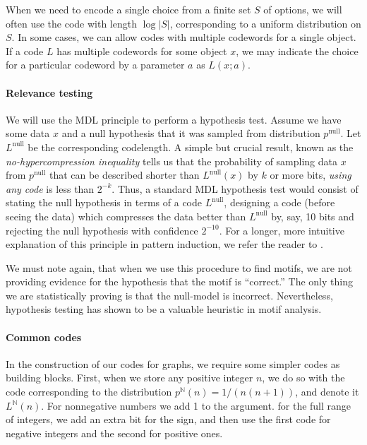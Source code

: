 \documentclass[letterpaper]{article} %
\newcommand{\N}{{\mathbb N}}
\begin{document}
When we need to encode a single choice from a finite set $S$ of options, we will often use the code with length $\log |S|$, corresponding to a uniform distribution on $S$. In some cases, we can allow codes with multiple codewords for a single object. If a code $L$ has multiple codewords for some object  $x$, we may indicate the choice for a particular codeword by a parameter $a$ as $L(x; a)$.

\paragraph{Relevance testing} We will use the MDL principle to perform a hypothesis test. Assume we have some data $x$ and a null hypothesis that it was sampled from distribution $p^\text{null}$. Let $L^\text{null}$ be the corresponding codelength. A simple but crucial result, known as the \emph{no-hypercompression inequality} \cite[p103]{grunwald2007minimum} tells us that the probability of sampling data $x$ from $p^\text{null}$ that can be described shorter than $L^\text{null}(x)$ by $k$ or more bits, \emph{using any code} is less than $2^{-k}$.
Thus, a standard MDL hypothesis test would consist of stating the null hypothesis in terms of a code $L^\text{null}$, designing a code (before seeing the data) which compresses the data better than $L^\text{null}$ by, say, 10 bits and rejecting the null hypothesis with confidence $2^{-10}$. For a longer, more intuitive explanation of this principle in pattern induction, we refer the reader to \cite[Section~2]{bloem2017large}.

We must note again, that when we use this procedure to find motifs, we are not providing evidence for the hypothesis that the motif is ``correct.'' The only thing we are statistically proving is that the null-model is incorrect. Nevertheless, hypothesis testing has shown to be a valuable heuristic in motif analysis.

\paragraph{Common codes}
In the construction of our codes for graphs, we require some simpler codes as building blocks. First, when we store any positive integer $n$, we do so with the code corresponding to the distribution $p^\N(n) = 1/(n(n+1))$, and denote it $L^\N(n)$. For nonnegative numbers we add 1 to the argument. for the full range of integers, we add an extra bit for the sign, and then use the first code for negative integers and the second for positive ones.
\end{document}
